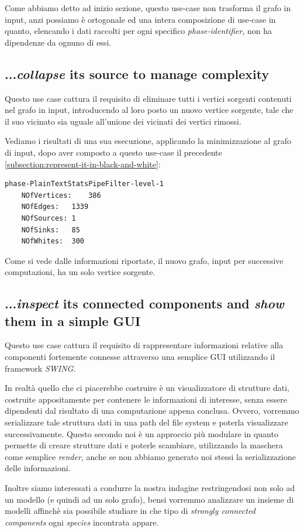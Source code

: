 Come abbiamo detto ad inizio sezione, questo use-case non trasforma il
grafo in input, anzi possiamo \`e ortogonale ed una intera
composizione di use-case in quanto, elencando i dati raccolti per ogni
specifico \emph{phase-identifier}, non ha dipendenze da ognuno di
essi.

\subsection{...\emph{collapse} its source to manage complexity}
Questo use case cattura il requisito di eliminare tutti i vertici
sorgenti contenuti nel grafo in input, introducendo al loro posto un
nuovo vertice sorgente, tale che il suo vicinato sia uguale all'unione
dei vicinati dei vertici rimossi.

Vediamo i risultati di una sua esecuzione, applicando la
minimizzazione al grafo di input, dopo aver composto a questo use-case
il precedente \ref{subsection:represent-it-in-black-and-white}:
\begin{lstlisting}
phase-PlainTextStatsPipeFilter-level-1
	NOfVertices:	386
	NOfEdges:	1339
	NOfSources:	1
	NOfSinks:	85
	NOfWhites:	300
\end{lstlisting}
Come si vede dalle informazioni riportate, il nuovo grafo, input per
successive computazioni, ha un solo vertice sorgente.

\subsection{...\emph{inspect} its connected components and \emph{show}
  them in a simple GUI}
\label{subsection:use-case-result-viewer}
Questo use case cattura il requisito di rappresentare informazioni
relative alla componenti fortemente connesse attraverso una semplice
GUI utilizzando il framework \emph{SWING}.

In realt\`a quello che ci piacerebbe costruire \`e un visualizzatore
di strutture dati, costruite appositamente per contenere le
informazioni di interesse, senza essere dipendenti dal risultato di
una computazione appena conclusa. Ovvero, vorremmo serializzare tale
struttura dati in una path del file system e poterla visualizzare
successivamente. Questo secondo noi \`e un approccio pi\`u modulare in
quanto permette di creare strutture dati e poterle scambiare,
utilizzando la maschera come semplice \emph{render}, anche se non
abbiamo generato noi stessi la serializzazione delle informazioni.

Inoltre siamo interessati a condurre la nostra indagine restringendosi
non solo ad un modello (e quindi ad un solo grafo), bensi vorremmo
analizzare un insieme di modelli affinch\`e sia possibile studiare in
che tipo di \emph{strongly connected components} ogni \emph{species}
incontrata appare.

